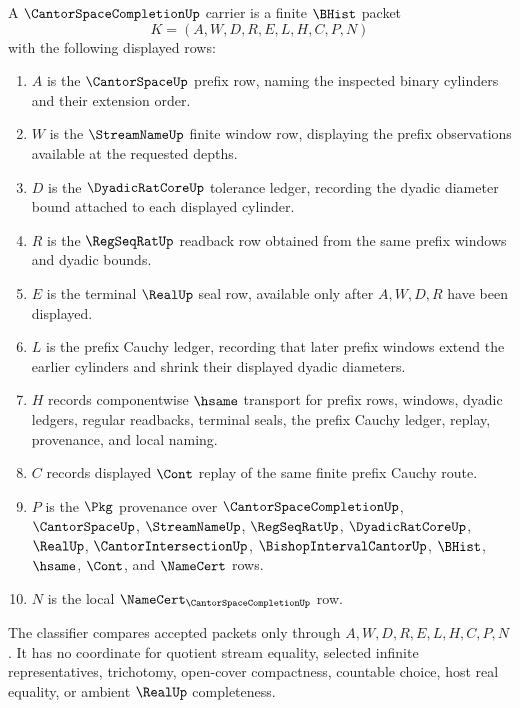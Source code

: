 \begin{definition}
\label{def:cantor-space-completion-carrier}
A $\CantorSpaceCompletionUp$ carrier is a finite $\BHist$ packet
$$
K=(A,W,D,R,E,L,H,C,P,N)
$$
with the following displayed rows:
\begin{enumerate}
\item $A$ is the $\CantorSpaceUp$ prefix row, naming the inspected binary cylinders and their extension order.
\item $W$ is the $\StreamNameUp$ finite window row, displaying the prefix observations available at the requested depths.
\item $D$ is the $\DyadicRatCoreUp$ tolerance ledger, recording the dyadic diameter bound attached to each displayed cylinder.
\item $R$ is the $\RegSeqRatUp$ readback row obtained from the same prefix windows and dyadic bounds.
\item $E$ is the terminal $\RealUp$ seal row, available only after $A,W,D,R$ have been displayed.
\item $L$ is the prefix Cauchy ledger, recording that later prefix windows extend the earlier cylinders and shrink their displayed dyadic diameters.
\item $H$ records componentwise $\hsame$ transport for prefix rows, windows, dyadic ledgers, regular readbacks, terminal seals, the prefix Cauchy ledger, replay, provenance, and local naming.
\item $C$ records displayed $\Cont$ replay of the same finite prefix Cauchy route.
\item $P$ is the $\Pkg$ provenance over $\CantorSpaceCompletionUp$, $\CantorSpaceUp$, $\StreamNameUp$, $\RegSeqRatUp$, $\DyadicRatCoreUp$, $\RealUp$, $\CantorIntersectionUp$, $\BishopIntervalCantorUp$, $\BHist$, $\hsame$, $\Cont$, and $\NameCert$ rows.
\item $N$ is the local $\NameCert_{\CantorSpaceCompletionUp}$ row.
\end{enumerate}
The classifier compares accepted packets only through $A,W,D,R,E,L,H,C,P,N$. It has no coordinate for quotient stream equality, selected infinite representatives, trichotomy, open-cover compactness, countable choice, host real equality, or ambient $\RealUp$ completeness.
\end{definition}

